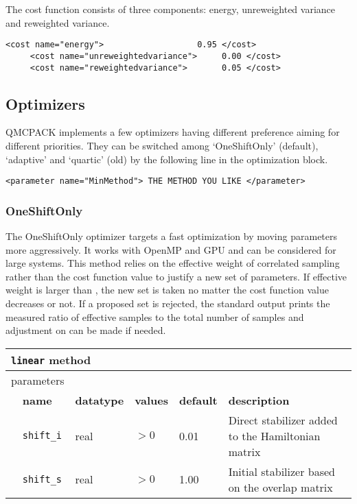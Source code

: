 The cost function consists of three components: energy, unreweighted variance and reweighted variance.
\begin{lstlisting}[style=QMCPXML]
     <cost name="energy">                   0.95 </cost>
     <cost name="unreweightedvariance">     0.00 </cost>
     <cost name="reweightedvariance">       0.05 </cost>
\end{lstlisting}

\subsection{Optimizers}
QMCPACK implements a few optimizers having different preference aiming for different priorities.
They can be switched among  `OneShiftOnly' (default), `adaptive' and `quartic' (old) by the following line in the optimization block.
\begin{lstlisting}
<parameter name="MinMethod"> THE METHOD YOU LIKE </parameter>
\end{lstlisting}

\subsubsection{OneShiftOnly}
The OneShiftOnly optimizer targets a fast optimization by moving parameters more aggressively. It works with OpenMP and GPU and can be considered for large systems.
This method relies on the effective weight of correlated sampling rather than the cost function value to justify a new set of parameters.
If effective weight is larger than , the new set is taken no matter the cost function value decreases or not.
If a proposed set is rejected, the standard output prints the measured ratio of effective samples to the total number of samples
and adjustment on  can be made if needed.

\begin{table}[h]
\begin{center}
\begin{tabularx}{\textwidth}{l l l l l X }
\hline
\multicolumn{6}{l}{\texttt{linear} method} \\
\hline
\multicolumn{2}{l}{parameters}  & \multicolumn{4}{l}{}\\
   &   \bfseries name     & \bfseries datatype & \bfseries values & \bfseries default   & \bfseries description \\
   &   \texttt{shift\_i} &  real     & $>0$ & 0.01 & Direct stabilizer added to the Hamiltonian matrix\\
   &   \texttt{shift\_s} &  real     & $>0$ & 1.00 & Initial stabilizer based on the overlap matrix\\
  \hline
\end{tabularx}
\end{center}
\end{table}

